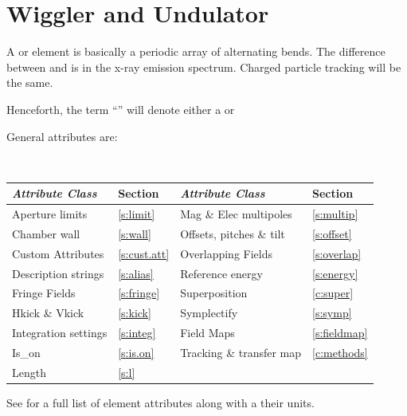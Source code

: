 {\newpage

\section{Wiggler and Undulator} 
\label{s:wiggler}

A  or  element is basically a periodic array of alternating bends.
The difference between  and  is in the x-ray emission spectrum.
Charged particle tracking will be the same. 

Henceforth, the term ``'' will denote either a  or 

General  attributes are:
\begin{center}
\tt
\begin{tabular}{llll} \toprule
  {\sl Attribute Class}      & Section           & {\sl Attribute Class}      & Section            \\ \midrule
  Aperture limits            & \ref{s:limit}     & Mag \& Elec multipoles     & \ref{s:multip}     \\
  Chamber wall               & \ref{s:wall}      & Offsets, pitches \& tilt   & \ref{s:offset}     \\
  Custom Attributes          & \ref{s:cust.att}  & Overlapping Fields         & \ref{s:overlap}    \\
  Description strings        & \ref{s:alias}     & Reference energy           & \ref{s:energy}     \\ 
  Fringe Fields              & \ref{s:fringe}    & Superposition              & \ref{c:super}      \\
  Hkick \& Vkick             & \ref{s:kick}      & Symplectify                & \ref{s:symp}       \\
  Integration settings       & \ref{s:integ}     & Field Maps                 & \ref{s:fieldmap}   \\
  Is_on                      & \ref{s:is.on}     & Tracking \& transfer map   & \ref{c:methods}    \\ 
  Length                     & \ref{s:l}         &                            &                    \\ 
  \bottomrule
\end{tabular}
\end{center}
\toffset
See  for a full list of element attributes along with a their units.

}
